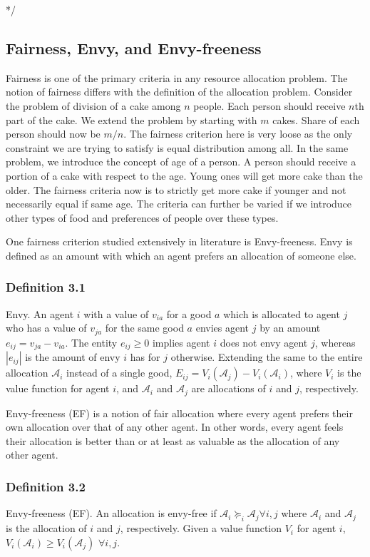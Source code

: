 */

\subsection{Fairness, Envy, and Envy-freeness}
\label{section_envy}
Fairness is one of the primary criteria in any resource allocation problem. The notion of fairness differs with the definition of the allocation problem. Consider the problem of division of a cake among $n$ people. Each person should receive $n$th part of the cake. We extend the problem by starting with $m$ cakes. Share of each person should now be $m/n$. The fairness criterion here is very loose as the only constraint we are trying to satisfy is equal distribution among all. In the same problem, we introduce the concept of age of a person. A person should receive a portion of a cake with respect to the age. Young ones will get more cake than the older. The fairness criteria now is to strictly get more cake if younger and not necessarily equal if same age. The criteria can further be varied if we introduce other types of food and preferences of people over these types.

One fairness criterion studied extensively in literature is Envy-freeness. Envy is defined as an amount with which an agent prefers an allocation of someone else. 

\subsubsection{Definition 3.1} Envy.
An agent $i$ with a value of $v_{ia}$ for a good $a$ which is allocated to agent $j$ who has a value of $v_{ja}$ for the same good $a$ envies agent $j$ by an
amount $e_{ij} = v_{ja} - v_{ia}$. The entity $e_{ij} \geq 0$ implies agent $i$ does not envy agent $j$, whereas $|e_{ij}|$ is the amount of envy $i$ has for $j$ otherwise. Extending the same to the entire allocation $\mathcal{A}_i$ instead of a single good, $E_{ij} = V_i(\mathcal{A}_j) - V_i(\mathcal{A}_i)$, where $V_i$ is the value function for agent $i$, and $\mathcal{A}_i$ and $\mathcal{A}_j$ are allocations of $i$ and $j$, respectively.

Envy-freeness (EF) is a notion of fair allocation where every agent prefers their own allocation over that of any other agent. In other words, every agent feels their allocation is better than or at least as valuable as the allocation of any other agent.

\subsubsection{Definition 3.2} Envy-freeness (EF).
An allocation is envy-free if $\mathcal{A}_i \succeq_i \mathcal{A}_j \forall i,j$ where $\mathcal{A}_i$ and $\mathcal{A}_j$ is the allocation of $i$ and $j$, respectively. Given a value function $V_i$ for agent $i$, $V_i(\mathcal{A}_i) \geq V_i(\mathcal{A}_j)$ $\forall i,j$. 

